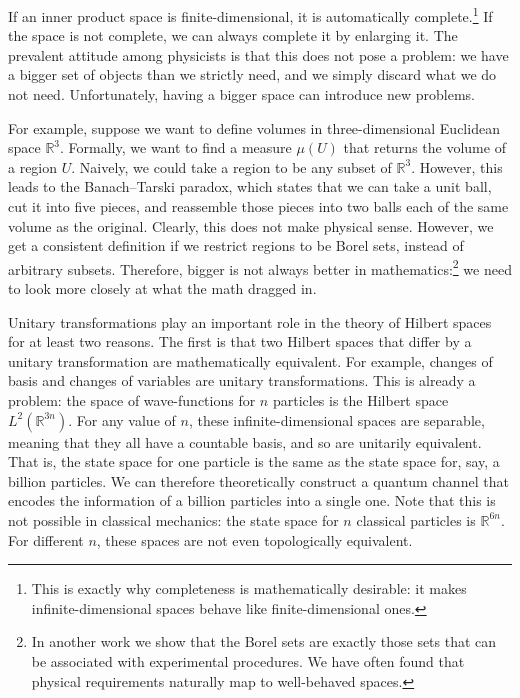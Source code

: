 \documentclass[10pt,twocolumn, nofootinbib]{revtex4-2}
\begin{document}
If an inner product space is finite-dimensional, it is automatically complete.\footnote{This is exactly why completeness is mathematically desirable: it makes infinite-dimensional spaces behave like finite-dimensional ones.} If the space is not complete, we can always complete it by enlarging it. The prevalent attitude among physicists is that this does not pose a problem: we have a bigger set of objects than we strictly need, and we simply discard what we do not need. Unfortunately, having a bigger space can introduce new problems.

For example, suppose we want to define volumes in three-dimensional Euclidean space $\mathbb{R}^3$. Formally, we want to find a measure $\mu(U)$ that returns the volume of a region $U$. Naively, we could take a region to be any subset of $\mathbb{R}^3$. However, this leads to the Banach–Tarski paradox,\cite{tao2021introduction} which states that we can take a unit ball, cut it into five pieces, and reassemble those pieces into two balls each of the same volume as the original. Clearly, this does not make physical sense. However, we get a consistent definition if we restrict regions to be Borel sets, instead of arbitrary subsets. Therefore, bigger is not always better in mathematics:\footnote{In another work\cite{aop-book} we show that the Borel sets are exactly those sets that can be associated with experimental procedures. We have often found that physical requirements naturally map to well-behaved spaces.} we need to look more closely at what the math dragged in.

Unitary transformations play an important role in the theory of Hilbert spaces for at least two reasons. The first is that two Hilbert spaces that differ by a unitary transformation are mathematically equivalent. For example, changes of basis and changes of variables are unitary transformations. This is already a problem: the space of wave-functions for $n$ particles is the Hilbert space $L^2(\mathbb{R}^{3n})$. For any value of $n$, these infinite-dimensional spaces are separable, meaning that they all have a countable basis, and so are unitarily equivalent. That is, the state space for one particle is the same as the state space for, say, a billion particles. We can therefore theoretically construct a quantum channel that encodes the information of a billion particles into a single one. Note that this is not possible in classical mechanics: the state space for $n$ classical particles is $\mathbb{R}^{6n}$. For different $n$, these spaces are not even topologically equivalent.
\end{document}
